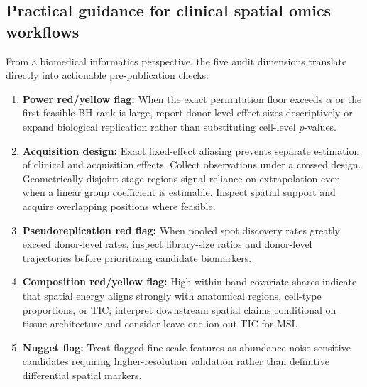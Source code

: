 \documentclass[11pt]{article}
\begin{document}
\subsection{Practical guidance for clinical spatial omics workflows}
From a biomedical informatics perspective, the five audit dimensions translate directly into actionable pre-publication checks:
\begin{enumerate}
\item \textbf{Power red/yellow flag:} When the exact permutation floor exceeds $\alpha$ or the first feasible BH rank is large, report donor-level effect sizes descriptively or expand biological replication rather than substituting cell-level $p$-values.
\item \textbf{Acquisition design:} Exact fixed-effect aliasing prevents separate estimation of clinical and acquisition effects. Collect observations under a crossed design. Geometrically disjoint stage regions signal reliance on extrapolation even when a linear group coefficient is estimable. Inspect spatial support and acquire overlapping positions where feasible.
\item \textbf{Pseudoreplication red flag:} When pooled spot discovery rates greatly exceed donor-level rates, inspect library-size ratios and donor-level trajectories before prioritizing candidate biomarkers.
\item \textbf{Composition red/yellow flag:} High within-band covariate shares indicate that spatial energy aligns strongly with anatomical regions, cell-type proportions, or TIC; interpret downstream spatial claims conditional on tissue architecture and consider leave-one-ion-out TIC for MSI.
\item \textbf{Nugget flag:} Treat flagged fine-scale features as abundance-noise-sensitive candidates requiring higher-resolution validation rather than definitive differential spatial markers.
\end{enumerate}
\end{document}
